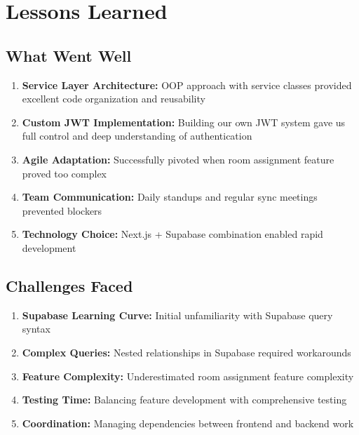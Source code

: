 \documentclass[12pt,a4paper]{article}
\begin{document}
\section{Lessons Learned}

\subsection{What Went Well}

\begin{enumerate}[noitemsep]
    \item \textbf{Service Layer Architecture:} OOP approach with service classes provided excellent code organization and reusability
    \item \textbf{Custom JWT Implementation:} Building our own JWT system gave us full control and deep understanding of authentication
    \item \textbf{Agile Adaptation:} Successfully pivoted when room assignment feature proved too complex
    \item \textbf{Team Communication:} Daily standups and regular sync meetings prevented blockers
    \item \textbf{Technology Choice:} Next.js + Supabase combination enabled rapid development
\end{enumerate}

\subsection{Challenges Faced}

\begin{enumerate}[noitemsep]
    \item \textbf{Supabase Learning Curve:} Initial unfamiliarity with Supabase query syntax
    \item \textbf{Complex Queries:} Nested relationships in Supabase required workarounds
    \item \textbf{Feature Complexity:} Underestimated room assignment feature complexity
    \item \textbf{Testing Time:} Balancing feature development with comprehensive testing
    \item \textbf{Coordination:} Managing dependencies between frontend and backend work
\end{enumerate}
\end{document}
